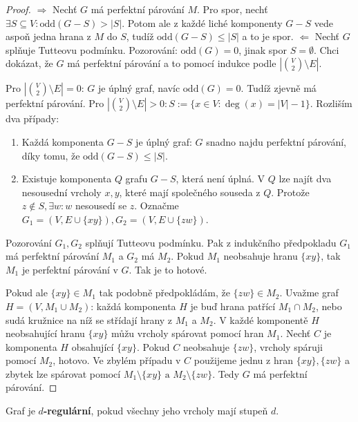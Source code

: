\begin{proof}
	$\Rightarrow$ Nechť $G$ má perfektní párování $M$. Pro spor, nechť $\exists S \subseteq V: \text{odd}(G-S) >|S|$. Potom ale z každé liché komponenty $G-S$ vede aspoň jedna hrana z $M$ do $S$, tudíž $\text{odd}(G-S) \leq |S|$ a to je spor. $\Leftarrow$ Nechť $G$ splňuje Tutteovu podmínku. Pozorování: $\text{odd}(G) = 0$, jinak spor $S = \emptyset$. Chci dokázat, že $G$ má perfektní párování a to pomocí indukce podle $|\binom{V}{2} \setminus E|$.
	
	Pro $|\binom{V}{2} \setminus E| = 0$: $G$ je úplný graf, navíc $\text{odd}(G) = 0$. Tudíž zjevně má perfektní párování. Pro $|\binom{V}{2} \setminus E| > 0: S:= \{x \in V: \deg (x) = |V|-1\}$. Rozliším dva případy:
	
	\begin{enumerate}
		\item Každá komponenta $G-S$ je úplný graf: $G$ snadno najdu perfektní párování, díky tomu, že $\text{odd}(G-S) \leq |S|$.
		\item Existuje komponenta $Q$ grafu $G-S$, která není úplná. V $Q$ lze najít dva nesousední vrcholy $x,y$, které mají společného souseda z $Q$. Protože $z \notin S, \exists w: w$ nesousedí se $z$. Označme $G_{1} = (V, E \cup \{xy\}), G_{2} = (V, E \cup \{zw\})$.
	\end{enumerate}
	
	Pozorování $G_{1}, G_{2}$ splňují Tutteovu podmínku. Pak z indukčního předpokladu $G_{1}$ má perfektní párování $M_{1}$ a $G_{2}$ má $M_{2}$. Pokud $M_{1}$ neobsahuje hranu $\{xy\}$, tak $M_{1}$ je perfektní párování v $G$. Tak je to hotové.
	
	Pokud ale $\{xy\} \in M_{1}$ tak podobně předpokládám, že $\{zw\} \in M_{2}$. Uvažme graf $H = (V, M_{1} \cup M_{2})$: každá komponenta $H$ je buď hrana patřící $M_{1} \cap M_{2}$, nebo sudá kružnice na níž se střídají hrany z $M_{1}$ a $M_{2}$. V každé komponentě $H$ neobsahující hranu $\{xy\}$ můžu vrcholy spárovat pomocí hran $M_{1}$. Nechť $C$ je komponenta $H$ obsahující $\{xy\}$. Pokud $C$ neobsahuje $\{zw\}$, vrcholy spáruji pomocí $M_{2}$, hotovo. Ve zbylém případu v $C$ použijeme jednu z hran $\{xy\}, \{zw\}$ a zbytek lze spárovat pomocí $M_{1} \setminus \{xy\} \text{ a } M_{2} \setminus \{zw\}$. Tedy $G$ má perfektní párování.
\end{proof}

\begin{definice}
	Graf je \textbf{$d$-regulární}, pokud všechny jeho vrcholy mají stupeň $d$.
\end{definice}

